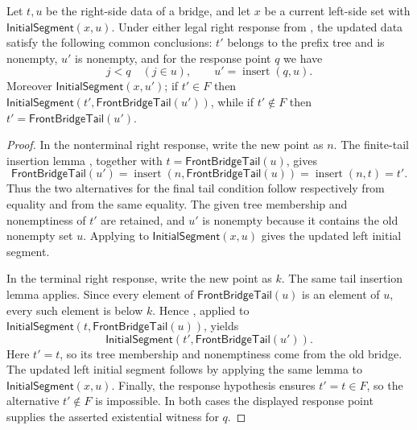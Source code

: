\begin{helper}
Let $t,u$ be the right-side data of a bridge, and let $x$ be a current
left-side set with $\mathsf{InitialSegment}(x,u)$.  Under either legal right
response from , the updated data satisfy
the following common conclusions: $t'$ belongs to the prefix tree and is
nonempty, $u'$ is nonempty, and for the response point $q$ we have
\[
  j<q\quad(j\in u),\qquad u'=\operatorname{insert}(q,u).
\]
Moreover $\mathsf{InitialSegment}(x,u')$; if $t'\in F$ then
$\mathsf{InitialSegment}(t',\mathsf{FrontBridgeTail}(u'))$, while if
$t'\notin F$ then $t'=\mathsf{FrontBridgeTail}(u')$.
\end{helper}
\begin{proof}
In the nonterminal right response, write the new point as $n$.  The
finite-tail insertion lemma , together with
$t=\mathsf{FrontBridgeTail}(u)$, gives
\[
 \mathsf{FrontBridgeTail}(u')
 =\operatorname{insert}(n,\mathsf{FrontBridgeTail}(u))
 =\operatorname{insert}(n,t)=t'.
\]
Thus the two alternatives for the final tail condition follow respectively
from equality and from the same equality.  The given tree membership and
nonemptiness of $t'$ are retained, and $u'$ is nonempty because it contains
the old nonempty set $u$.  Applying  to
$\mathsf{InitialSegment}(x,u)$ gives the updated left initial segment.

In the terminal right response, write the new point as $k$.  The same tail
insertion lemma applies.  Since every element of $\mathsf{FrontBridgeTail}(u)$
is an element of $u$, every such element is below $k$.  Hence
, applied to
$\mathsf{InitialSegment}(t,\mathsf{FrontBridgeTail}(u))$, yields
\[
 \mathsf{InitialSegment}(t',\mathsf{FrontBridgeTail}(u')).
\]
Here $t'=t$, so its tree membership and nonemptiness come from the old
bridge.  The updated left initial segment follows by applying the same
lemma to $\mathsf{InitialSegment}(x,u)$.  Finally, the response hypothesis
ensures $t'=t\in F$, so the alternative $t'\notin F$ is impossible.  In
both cases the displayed response point supplies the asserted existential
witness for $q$.
\end{proof}

